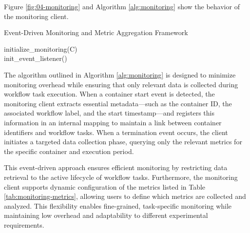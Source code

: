 Figure \ref{fig:04-monitoring} and Algorithm \ref{alg:monitoring} show the behavior of the monitoring client.

\begin{algorithm}[H]
    \caption{Event-Driven Monitoring and Metric Aggregation Framework}
    \label{alg:monitoring}

    \BlankLine
    initialize\_monitoring(C)\\
    init\_event\_listener()\\
\end{algorithm}

The algorithm outlined in Algorithm \ref{alg:monitoring} is designed to minimize monitoring overhead while ensuring that only relevant data is collected during workflow task execution. When a container start event is detected, the monitoring client extracts essential metadata—such as the container ID, the associated workflow label, and the start timestamp—and registers this information in an internal mapping to maintain a link between container identifiers and workflow tasks. When a termination event occurs, the client initiates a targeted data collection phase, querying only the relevant metrics for the specific container and execution period.

This event-driven approach ensures efficient monitoring by restricting data retrieval to the active lifecycle of workflow tasks. Furthermore, the monitoring client supports dynamic configuration of the metrics listed in Table \ref{tab:monitoring-metrics}, allowing users to define which metrics are collected and analyzed. This flexibility enables fine-grained, task-specific monitoring while maintaining low overhead and adaptability to different experimental requirements.

